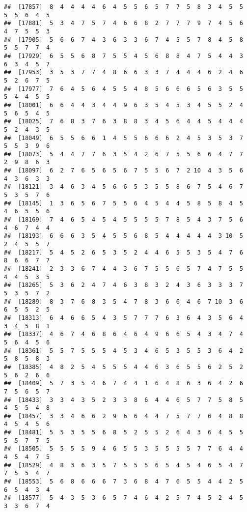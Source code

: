 \documentclass[
]{book}
\begin{document}
\begin{verbatim}
##  [17857]  8  4  4  4  4  6  4  5  5  6  5  7  7  5  8  3  4  5  5  5  5  6  4  5
##  [17881]  5  3  4  7  5  7  4  6  6  8  2  7  7  7  9  7  4  5  6  4  7  5  5  3
##  [17905]  5  6  6  7  4  3  6  3  3  6  7  4  5  5  7  8  4  5  8  5  5  7  7  4
##  [17929]  6  5  5  6  8  7  5  5  4  5  6  8  8  4  7  5  4  4  3  6  3  4  5  7
##  [17953]  3  5  3  7  7  4  8  6  6  3  3  7  4  4  4  6  2  4  6  5  2  6  7  5
##  [17977]  7  6  4  5  6  4  5  5  4  8  5  6  6  6  5  6  3  5  5  5  4  4  5  5
##  [18001]  6  6  4  4  3  4  4  9  6  3  5  4  5  3  4  5  5  2  4  5  6  5  4  5
##  [18025]  7  6  8  3  7  6  3  8  8  3  4  5  6  4  4  5  4  4  4  5  2  4  3  5
##  [18049]  6  5  5  6  6  1  4  5  5  6  6  6  2  4  5  3  5  3  7  5  5  3  9  6
##  [18073]  5  4  4  7  7  6  3  5  4  2  6  7  5  5  6  6  4  7  7  2  9  8  6  3
##  [18097]  6  2  7  6  5  6  5  6  7  5  5  6  7  2 10  4  3  5  6  4  3  6  3  3
##  [18121]  3  4  6  3  4  5  6  6  5  3  5  5  8  6  7  5  4  6  7  5  3  5  7  6
##  [18145]  1  3  6  5  6  7  5  5  6  4  5  4  4  5  8  5  8  4  5  4  6  5  5  6
##  [18169]  7  4  6  5  4  5  4  5  5  5  5  7  8  5  4  3  7  5  6  4  6  7  4  4
##  [18193]  6  6  6  3  5  4  5  5  6  8  5  4  4  4  4  4  3 10  5  2  4  5  5  7
##  [18217]  5  4  5  2  6  5  3  5  2  4  4  6  5  5  3  5  4  7  6  8  6  6  7  7
##  [18241]  2  3  3  6  7  4  4  3  6  7  5  5  6  5  7  4  7  5  5  4  4  5  3  5
##  [18265]  5  3  6  2  4  7  4  6  3  8  3  2  4  3  6  3  3  3  7  5  3  5  7  2
##  [18289]  8  3  7  6  8  3  5  4  7  8  3  6  6  4  6  7 10  3  6  6  5  5  2  5
##  [18313]  6  4  6  6  5  4  3  5  7  7  7  6  3  6  4  3  5  6  4  3  4  5  8  1
##  [18337]  4  6  7  4  6  8  6  4  6  4  9  6  6  5  4  3  4  7  4  5  6  4  5  6
##  [18361]  5  5  7  5  5  5  4  5  3  4  6  5  3  5  5  3  6  4  2  5  8  5  8  3
##  [18385]  4  8  2  5  4  5  5  5  4  4  6  3  6  5  5  6  2  5  2  5  6  2  6  6
##  [18409]  5  7  3  5  4  6  7  4  4  1  6  4  8  6  3  6  4  2  6  7  5  6  5  7
##  [18433]  3  3  4  3  5  2  3  3  8  6  4  4  6  5  7  7  5  8  5  4  5  5  4  8
##  [18457]  3  3  4  6  6  2  9  6  6  4  4  7  5  7  7  6  4  8  8  4  5  4  5  6
##  [18481]  5  5  3  5  5  6  8  5  2  5  5  2  6  4  3  6  4  5  5  5  5  7  7  5
##  [18505]  5  5  5  5  9  4  6  5  5  3  5  5  5  5  7  7  6  4  4  4  5  4  7  5
##  [18529]  4  8  3  6  3  5  7  5  5  5  6  5  4  5  4  6  5  4  7  7  5  5  4  7
##  [18553]  5  6  8  6  6  6  7  3  6  8  4  7  6  5  5  4  4  2  5  6  5  4  3  4
##  [18577]  5  4  3  5  3  6  5  7  4  6  4  2  5  7  4  5  2  4  5  3  3  6  7  4

\end{verbatim}
\end{document}
